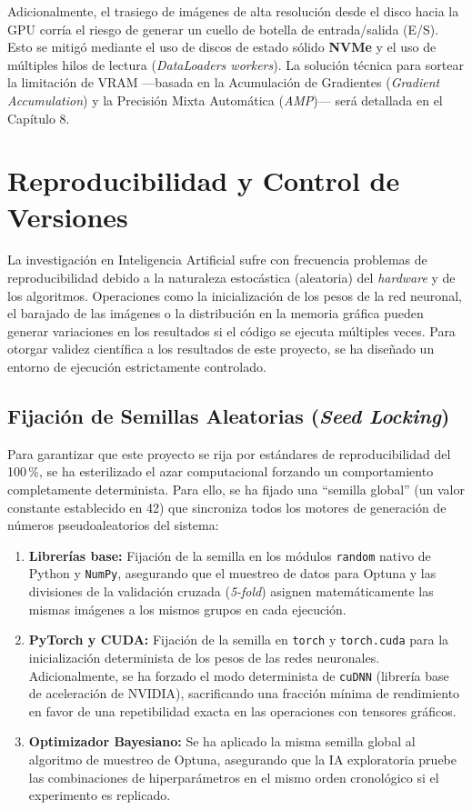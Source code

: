 Adicionalmente, el trasiego de imágenes de alta resolución desde el disco hacia la GPU corría el riesgo de generar un cuello de botella de entrada/salida (E/S). Esto se mitigó mediante el uso de discos de estado sólido \textbf{NVMe} y el uso de múltiples hilos de lectura (\textit{DataLoaders workers}). La solución técnica para sortear la limitación de VRAM ---basada en la Acumulación de Gradientes (\textit{Gradient Accumulation}) y la Precisión Mixta Automática (\textit{AMP})--- será detallada en el Capítulo 8.

\section{Reproducibilidad y Control de Versiones}

La investigación en Inteligencia Artificial sufre con frecuencia problemas de reproducibilidad debido a la naturaleza estocástica (aleatoria) del \textit{hardware} y de los algoritmos. Operaciones como la inicialización de los pesos de la red neuronal, el barajado de las imágenes o la distribución en la memoria gráfica pueden generar variaciones en los resultados si el código se ejecuta múltiples veces. Para otorgar validez científica a los resultados de este proyecto, se ha diseñado un entorno de ejecución estrictamente controlado.

\subsection{Fijación de Semillas Aleatorias (\textit{Seed Locking})}

Para garantizar que este proyecto se rija por estándares de reproducibilidad del 100\,\%, se ha esterilizado el azar computacional forzando un comportamiento completamente determinista. Para ello, se ha fijado una ``semilla global'' (un valor constante establecido en 42) que sincroniza todos los motores de generación de números pseudoaleatorios del sistema:

\begin{enumerate}
	\item \textbf{Librerías base:} Fijación de la semilla en los módulos \texttt{random} nativo de Python y \texttt{NumPy}, asegurando que el muestreo de datos para Optuna y las divisiones de la validación cruzada (\textit{5-fold}) asignen matemáticamente las mismas imágenes a los mismos grupos en cada ejecución.
	
	\item \textbf{PyTorch y CUDA:} Fijación de la semilla en \texttt{torch} y \texttt{torch.cuda} para la inicialización determinista de los pesos de las redes neuronales. Adicionalmente, se ha forzado el modo determinista de \texttt{cuDNN} (librería base de aceleración de NVIDIA), sacrificando una fracción mínima de rendimiento en favor de una repetibilidad exacta en las operaciones con tensores gráficos.
	
	\item \textbf{Optimizador Bayesiano:} Se ha aplicado la misma semilla global al algoritmo de muestreo de Optuna, asegurando que la IA exploratoria pruebe las combinaciones de hiperparámetros en el mismo orden cronológico si el experimento es replicado.
\end{enumerate}

